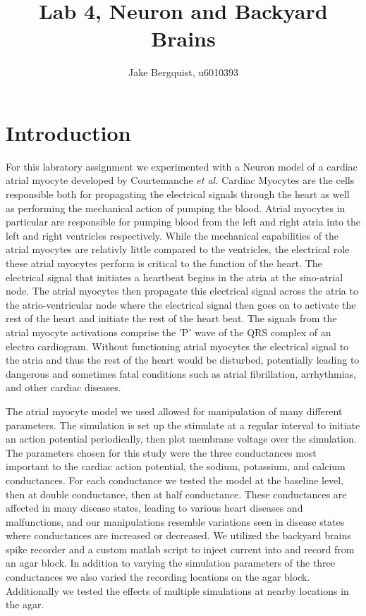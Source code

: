 \documentclass[12pt]{article}
\newcommand{\etal}{{\em et al.}}
\begin{document}
\title{Lab 4, Neuron and Backyard Brains}
\author{Jake Bergquist, u6010393}
\maketitle
\tableofcontents
\newpage

\section{Introduction}
\par{}
For this labratory assignment we experimented with a Neuron model of a cardiac atrial myocyte developed by Courtemanche \etal{} \cite{Courtemanche1998} Cardiac Myocytes are the cells responsible both for propagating the electrical signals through the heart as well as performing the mechanical action of pumping the blood. Atrial myocytes in particular are responsible for pumping blood from the left and right atria into the left and right ventricles respectively. While the mechanical capabilities of the atrial myocytes are relativly little compared to the ventricles, the electrical role these atrial myocytes perform is critical to the function of the heart. The electrical signal that initiates a heartbeat begins in the atria at the sino-atrial node. The atrial myocytes then propagate this electrical signal across the atria to the atrio-ventricular node where the electrical signal then goes on to activate the rest of the heart and initiate the rest of the heart beat. The signals from the atrial myocyte activations comprise the 'P' wave of the QRS complex of an electro cardiogram. Without functioning atrial myocytes the electrical signal to the atria and thus the rest of the heart would be disturbed, potentially leading to dangerous and sometimes fatal conditions such as atrial fibrillation, arrhythmias, and other cardiac diseases.
\par{}
The atrial myocyte model we used allowed for manipulation of many different parameters. The simulation is set up the stimulate at a regular interval to initiate an action potential periodically, then plot membrane voltage over the simulation. The parameters chosen for this study were the three conductances most important to the cardiac action potential, the sodium, potassium, and calcium conductances. For each conductance we tested the model at the baseline level, then at double conductance, then at half conductance. These conductances are affected in many disease states, leading to various heart diseases and malfunctions, and our manipulations resemble variations seen in disease states where conductances are increased or decreased.\cite{DaFaria2008} We utilized the backyard brains spike recorder and a custom matlab script to inject current into and record from an agar block. In addition to varying the simulation parameters of the three conductances we also varied the recording locations on the agar block. Additionally we tested the effects of multiple simulations at nearby locations in the agar.
\end{document}
